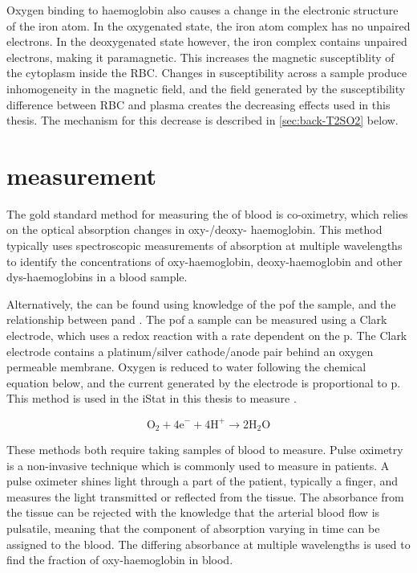 Oxygen binding to haemoglobin also causes a change in the electronic structure of the iron atom. \cite{PaulingMagneticPropertiesStructure1936}
In the oxygenated state, the iron atom complex has no unpaired electrons.
In the deoxygenated state however, the iron complex contains unpaired electrons, making it paramagnetic.
This increases the magnetic susceptiblity of the cytoplasm inside the RBC.
Changes in susceptibility across a sample produce inhomogeneity in the \Bzero magnetic field, and the field generated by the susceptibility difference between RBC and plasma creates the decreasing \Ttwo effects used in this thesis.
The mechanism for this decrease is described in \autoref{sec:back-T2SO2} below.

\section{\SOtwo measurement}
\label{sec:back-pulseox}
The gold standard method for measuring the \SOtwo of blood is co-oximetry, which relies on the optical absorption changes in oxy-/deoxy- haemoglobin\cite{ToffalettiMisconceptionsreportingoxygen2007}.
This method typically uses spectroscopic measurements of absorption at multiple wavelengths to identify the concentrations of oxy-haemoglobin, deoxy-haemoglobin and other dys-haemoglobins in a blood sample.

Alternatively, the \SOtwo can be found using knowledge of the p\Otwo of the sample, and the relationship between p\Otwo and \SOtwo.
The p\Otwo of a sample can be measured using a Clark electrode, which uses a redox reaction with a rate dependent on the p\Otwo.
The Clark electrode contains a platinum/silver cathode/anode pair behind an oxygen permeable membrane.
Oxygen is reduced to water following the chemical equation below, and the current generated by the electrode is proportional to p\Otwo.
This method is used in the iStat in this thesis to measure \SOtwo.

\begin{equation}
\mathrm{O}_2 + \mathrm{4e}^- + \mathrm{4 H}^+ \rightarrow \mathrm{2H}_2\mathrm{O}
\label{eq:ClarkO2}
\end{equation}

These methods both require taking samples of blood to measure.
Pulse oximetry is a non-invasive technique which is commonly used to measure \SOtwo in patients.
A pulse oximeter shines light through a part of the patient, typically a finger, and measures the light transmitted or reflected from the tissue.
The absorbance from the tissue can be rejected with the knowledge that the arterial blood flow is pulsatile, meaning that the component of absorption varying in time can be assigned to the blood. \cite{WiebenLightAbsorbancePulse1997}
The differing absorbance at multiple wavelengths is used to find the fraction of oxy-haemoglobin in blood.

